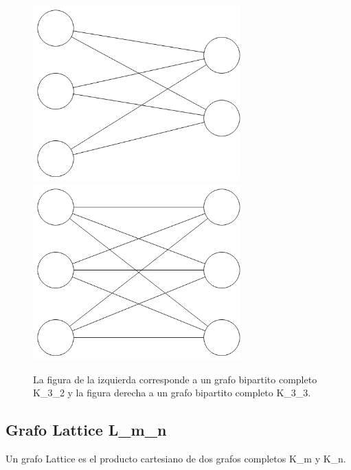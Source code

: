 \begin{figure}[H]
\includegraphics[width=80mm]{K3_2.png}
\includegraphics[width=80mm]{K3_3.png}
\caption{La figura de la izquierda corresponde a un grafo bipartito completo K_3_2 y la figura derecha a un grafo bipartito completo K_3_3.}
\label{overflow}
\end{figure}


\subsection{Grafo Lattice L_m_n}
Un grafo Lattice es el producto cartesiano de dos grafos completos K_m y K_n.

